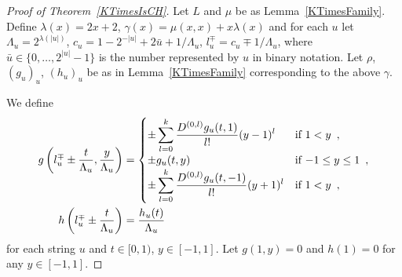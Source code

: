 \begin{proof}[Proof of Theorem~\ref{KTimesIsCH}]
Let $L$ and $\mu$ be as Lemma~\ref{KTimesFamily}.
Define
$
  \lambda(x) = 2x + 2
$, $
  \gamma(x) = \mu(x, x) + x \lambda(x)
$
and for each $u$ let
$
 \Lambda_u = 2^{\lambda(|u|)}
$, $
 c_u = 1-{2^{-|u|}}+{2\bar{u}+1}/{\Lambda_u}
$, $
 l_u^\mp = c_u\mp{1}/{\Lambda_u}
$,
 where $\bar u \in \{0, \dots, 2^{|u|} - 1\}$ is the number represented by $u$ in binary notation.
Let $\rho$, $(g_u)_u$, $(h_u)_u$ be as in Lemma~\ref{KTimesFamily} 
corresponding to the above $\gamma$.

We define
 \begin{align} \label{eq:g}
 g \left(l^\mp_u \pm \frac{t}{\Lambda_u}, \frac{y}{\Lambda_u}\right)
  &= \begin{cases}
      \pm \displaystyle \sum_{l=0}^k \frac{D^{(0,l)}g_u(t,1)}{l!} (y-1)^l 
      &  \text{if} \ 1<y \enspace , \\
      \pm g_u(t, y)      & \text{if} \ {-1} \le y \le 1 \enspace , \\
      \pm \displaystyle \sum_{l=0}^k \frac{D^{(0,l)}g_u(t,-1)}{l!} (y+1)^l  
      &  \text{if} \ 1<y \enspace , \\
    \end{cases} 
  \\
 h \left( l^\mp_u \pm \frac{t}{\Lambda_u} \right) 
  & = \frac{h_u(t)}{\Lambda_u}
\end{align}
for each string $u$ and $t \in [0,1)$, $y \in [-1, 1]$.
Let $g(1,y) = 0$ and $h(1) = 0$ for any $y \in [-1,1]$.


\end{proof}
